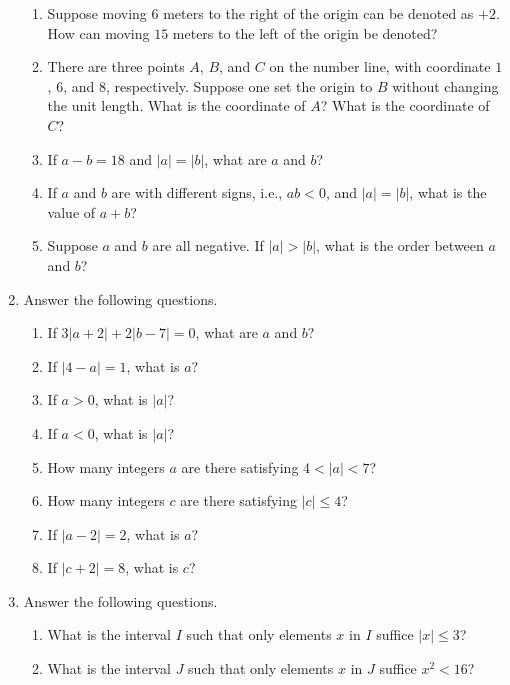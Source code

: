 \documentclass[11pt]{book}
\theoremstyle{break}
\theoremstyle{no_label}
\numberwithin{equation}{section}
\begin{document}
\begin{enumerate}[label=\arabic*.]
\begin{enumerate}
        \item Suppose moving $6$ meters to the right of the origin can be denoted as $+2$. How can moving $15$ meters to the left of the origin be denoted?
        \item There are three points $A$, $B$, and $C$ on the number line, with coordinate $1$, $6$, and $8$, respectively. Suppose one set the origin to $B$ without changing the unit length. What is the coordinate of $A$? What is the coordinate of $C$?
        \item If $a-b=18$ and $|a|=|b|$, what are $a$ and $b$?
        \item If $a$ and $b$ are with different signs, i.e., $ab<0$, and $|a|=|b|$, what is the value of $a+b$?
        \item Suppose $a$ and $b$ are all negative. If $|a|>|b|$, what is the order between $a$ and $b$?
    \end{enumerate}
    \item Answer the following questions.
    \begin{enumerate}
        \item If $3|a+2|+2|b-7|=0$, what are $a$ and $b$?
        \item If $|4-a|=1$, what is $a$?
        \item If $a>0$, what is $|a|$?
        \item If $a<0$, what is $|a|$?
        \item How many integers $a$ are there satisfying $4<|a|<7$?
        \item How many integers $c$ are there satisfying $|c|\leq 4$?
        \item If $|a-2|=2$, what is $a$?
        \item If $|c+2|=8$, what is $c$?
    \end{enumerate}
    \item Answer the following questions.
    \begin{enumerate}
        \item What is the interval $I$ such that only elements $x$ in $I$ suffice $|x|\leq 3$?
        \item What is the interval $J$ such that only elements $x$ in $J$ suffice $x^2<16$?
    \end{enumerate}

\end{enumerate}
\end{document}
